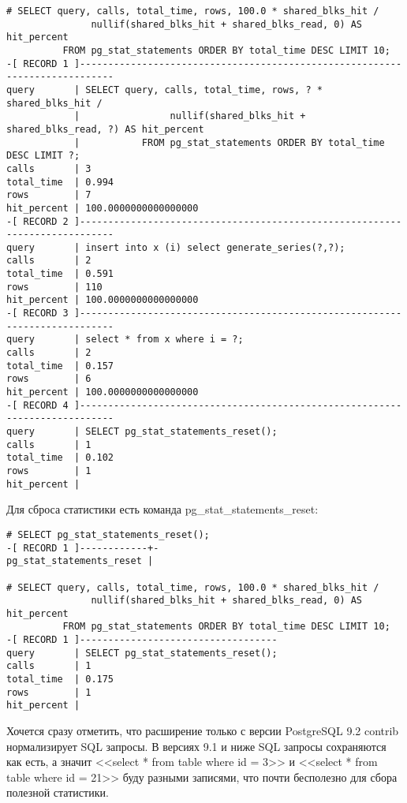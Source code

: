 \begin{lstlisting}[label=lst:sql_performance14,caption=pg\_stat\_statements статистика]
# SELECT query, calls, total_time, rows, 100.0 * shared_blks_hit /
               nullif(shared_blks_hit + shared_blks_read, 0) AS hit_percent
          FROM pg_stat_statements ORDER BY total_time DESC LIMIT 10;
-[ RECORD 1 ]----------------------------------------------------------------------------
query       | SELECT query, calls, total_time, rows, ? * shared_blks_hit /
            |                nullif(shared_blks_hit + shared_blks_read, ?) AS hit_percent
            |           FROM pg_stat_statements ORDER BY total_time DESC LIMIT ?;
calls       | 3
total_time  | 0.994
rows        | 7
hit_percent | 100.0000000000000000
-[ RECORD 2 ]----------------------------------------------------------------------------
query       | insert into x (i) select generate_series(?,?);
calls       | 2
total_time  | 0.591
rows        | 110
hit_percent | 100.0000000000000000
-[ RECORD 3 ]----------------------------------------------------------------------------
query       | select * from x where i = ?;
calls       | 2
total_time  | 0.157
rows        | 6
hit_percent | 100.0000000000000000
-[ RECORD 4 ]----------------------------------------------------------------------------
query       | SELECT pg_stat_statements_reset();
calls       | 1
total_time  | 0.102
rows        | 1
hit_percent | 
\end{lstlisting}

Для сброса статистики есть команда pg\_stat\_statements\_reset:

\begin{lstlisting}[label=lst:sql_performance15,caption=Сброс статистика]
# SELECT pg_stat_statements_reset();
-[ RECORD 1 ]------------+-
pg_stat_statements_reset | 

# SELECT query, calls, total_time, rows, 100.0 * shared_blks_hit /
               nullif(shared_blks_hit + shared_blks_read, 0) AS hit_percent
          FROM pg_stat_statements ORDER BY total_time DESC LIMIT 10;
-[ RECORD 1 ]-----------------------------------
query       | SELECT pg_stat_statements_reset();
calls       | 1
total_time  | 0.175
rows        | 1
hit_percent | 
\end{lstlisting}

Хочется сразу отметить, что расширение только с версии PostgreSQL 9.2 contrib нормализирует SQL запросы. В версиях 9.1 и ниже SQL запросы сохраняются как есть, а значит <<select * from table where id = 3>> и <<select * from table where id = 21>> буду разными записями, что почти бесполезно для сбора полезной статистики.